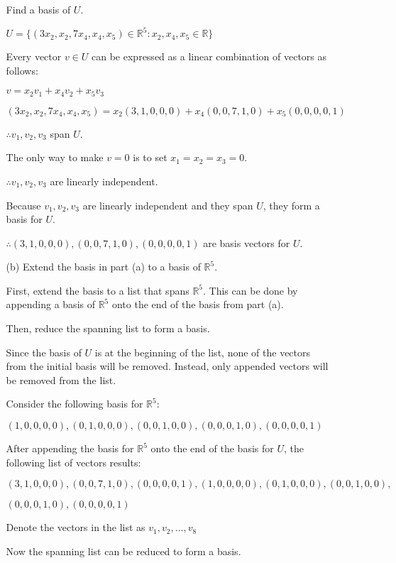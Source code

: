 \documentclass[fleqn]{article}
\begin{document}
\begin{enumerate}[nolistsep]
\begin{enumerate}[nolistsep]
				Find a basis of $U$.
				
				$U = \{(3x_2, x_2, 7x_4, x_4, x_5) \in \mathbb{R}^5 : x_2, x_4, x_5 \in \mathbb{R}\}$
				
				Every vector $v \in U$ can be expressed as a linear combination of vectors as follows:
				
				$v = x_2v_1 + x_4v_2 + x_5v_3$
				
				$(3x_2, x_2, 7x_4, x_4, x_5) = x_2(3, 1, 0, 0, 0) + x_4(0, 0, 7, 1, 0) + x_5(0, 0, 0, 0, 1)$
				
				$\therefore v_1, v_2, v_3$ span $U$.
									
				The only way to make $v = 0$ is to set $x_1 = x_2 = x_3 = 0$.
				
				$\therefore v_1, v_2, v_3$ are linearly independent.
				
				Because $v_1, v_2, v_3$ are linearly independent and they span $U$, they form a basis for $U$.
				
				$\therefore (3, 1, 0, 0, 0), (0, 0, 7, 1, 0), (0, 0, 0, 0, 1)$ are basis vectors for $U$.
				
				\item[(b)] Extend the basis in part (a) to a basis of $\mathbb{R}^5$.
				
				First, extend the basis to a list that spans $\mathbb{R}^5$. This can be done by appending a basis of $\mathbb{R}^5$ onto the end of the basis from part (a).
				
				Then, reduce the spanning list to form a basis.
				
				Since the basis of $U$ is at the beginning of the list, none of the vectors from the initial basis will be removed. Instead, only appended vectors will be removed from the list.
				
				Consider the following basis for $\mathbb{R}^5$:
				
				$(1, 0, 0, 0, 0), (0, 1, 0, 0, 0), (0, 0, 1, 0, 0), (0, 0, 0, 1, 0), (0, 0, 0, 0, 1)$
				
				After appending the basis for $\mathbb{R}^5$ onto the end of the basis for $U$, the following list of vectors results:
				
				$(3, 1, 0, 0, 0), (0, 0, 7, 1, 0), (0, 0, 0, 0, 1), (1, 0, 0, 0, 0), (0, 1, 0, 0, 0), (0, 0, 1, 0, 0),$
				
				$(0, 0, 0, 1, 0), (0, 0, 0, 0, 1)$
				
				Denote the vectors in the list as $v_1, v_2, ..., v_8$
				
				Now the spanning list can be reduced to form a basis.
				

\end{enumerate}
\end{enumerate}
\end{document}
